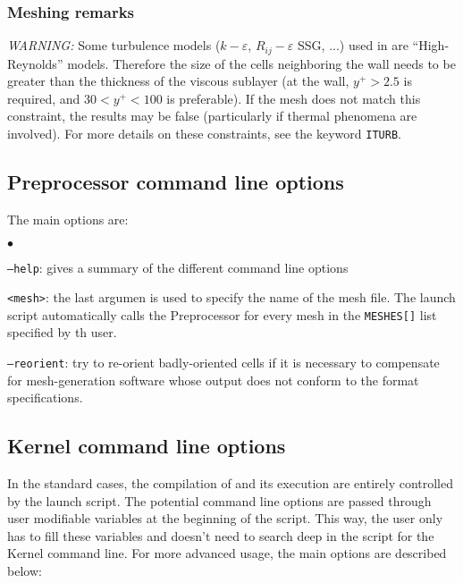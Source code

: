 {{{%
\subsubsection{Meshing remarks}
\label{prg_maillages}%

{\em WARNING: }
Some turbulence models ($k-\varepsilon$, $R_{ij}-\varepsilon$ SSG, ...) used in
\CS are ``High-Reynolds'' models. Therefore the size of the cells
neighboring the wall needs to be greater than the thickness of the viscous
sublayer (at the wall, $y^+>2.5$ is required, and $30<y^+<100$ is
preferable). If the mesh does not match this constraint, the results may
be false (particularly if thermal phenomena are involved). For more details
on these constraints, see the keyword \texttt{ITURB}.

\subsection{Preprocessor command line options}
\label{prg_optappelecs}%
The main options are:
\begin{list}{$\bullet$}{}
\item \texttt{--help}: gives a summary of the different command line options

\item \texttt{<mesh>}: the last argumen is used to specify the name of the mesh file.
The launch script automatically calls the Preprocessor for every
mesh in the \texttt{MESHES[]} list specified by th user.

\item \texttt{--reorient}: try to re-orient badly-oriented cells
if it is necessary to compensate for mesh-generation software
whose output does not conform to the format specifications.

\end{list}

\subsection{Kernel command line options}
\label{prg_optappelnoy}%
In the standard cases, the compilation of \CS and its execution are entirely
controlled by the launch script. The potential command line options are passed
through user modifiable variables at the beginning of the script. This way, the
user only has to fill these variables and doesn't need
to search deep in the script for the Kernel command line. For more advanced
usage, the main options are described below:

}}}
